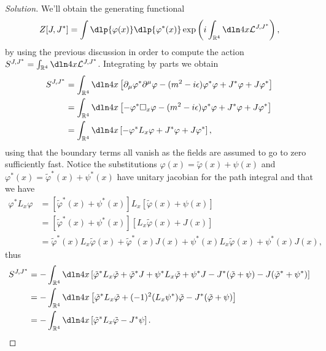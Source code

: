\begin{proof}[Solution]
    We'll obtain the generating functional
    \begin{equation*}
        Z[J,J^*] = \int \dlp{\varphi(x)} \dlp{\varphi^*(x)} \exp\left(i \int_{\mathbb{R}^4} \dln4x \mathcal{L}^{J,J^*}\right),
    \end{equation*}
    by using the previous discussion in order to compute the action \(S^{J,J^*} = \int_{\mathbb{R}^4} \dln4x \mathcal{L}^{J,J^*}\). Integrating by parts we obtain
    \begin{align*}
        S^{J,J^*} &= \int_{\mathbb{R}^4} \dln4x \left[\partial_\mu \varphi^* \partial^\mu \varphi - (m^2 - i \epsilon) \varphi^* \varphi + J^* \varphi + J \varphi^*\right]\\
                  &= \int_{\mathbb{R}^4} \dln4x \left[- \varphi^* \square_x \varphi - (m^2 - i \epsilon) \varphi^* \varphi + J^* \varphi + J\varphi^*\right]\\
                  &= \int_{\mathbb{R}^4} \dln4x \left[- \varphi^* L_x \varphi + J^* \varphi + J \varphi^*\right],
    \end{align*}
    using that the boundary terms all vanish as the fields are assumed to go to zero sufficiently fast. Notice the substitutions \(\varphi(x) = \tilde{\varphi}(x) + \psi(x)\) and \(\varphi^*(x) = \tilde{\varphi}^*(x) + \psi^*(x)\) have unitary jacobian for the path integral and that we have
    \begin{align*}
        \varphi^* L_x \varphi &= \left[\tilde{\varphi}^*(x) + \psi^*(x)\right]L_x \left[\tilde{\varphi}(x) + \psi(x)\right]\\
                              &= \left[\tilde{\varphi}^*(x) + \psi^*(x)\right] \left[L_x \tilde{\varphi}(x) + J(x)\right]\\
                              &= \tilde{\varphi}^*(x) L_x \tilde{\varphi}(x) + \tilde{\varphi}^*(x) J(x) + \psi^*(x) L_x \tilde{\varphi}(x) + \psi^*(x) J(x),
    \end{align*}
    thus
    \begin{align*}
        S^{J, J^*} &= - \int_{\mathbb{R}^4} \dln4x \left[ \tilde{\varphi}^* L_x \tilde{\varphi} + \tilde{\varphi}^* J + \psi^* L_x \tilde{\varphi} + \psi^* J  - J^*(\tilde{\varphi} + \psi) - J(\tilde{\varphi}^*  +\psi^*) \right]\\
                   &= - \int_{\mathbb{R}^4} \dln4x \left[\tilde{\varphi}^* L_x \tilde{\varphi} + (-1)^{2}(L_x\psi^*) \tilde{\varphi} - J^* (\tilde{\varphi} + \psi)\right]\\
                   &= - \int_{\mathbb{R}^4} \dln4x \left[\tilde{\varphi}^* L_x \tilde{\varphi} - J^* \psi\right].

\end{align*}
\end{proof}
